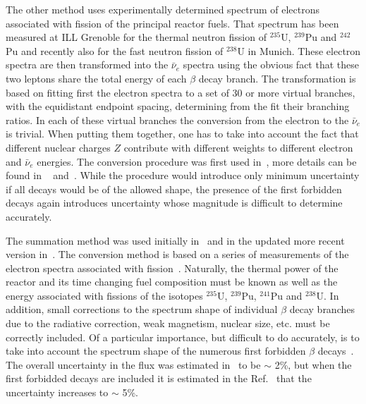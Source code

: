 \documentclass[aps,twocolumn,preprintnumbers,amsmath,superscriptaddress,amssymb,floats,nofootinbib]{revtex4-1}
\begin{document}
 The other method uses experimentally determined spectrum of electrons associated with fission of the principal reactor fuels. That spectrum has been 
 measured at ILL Grenoble for the thermal neutron fission of $^{235}$U, $^{239}$Pu and $^{242}$Pu and recently also for the fast neutron fission of $^{238}$U
 in Munich. These electron spectra are then transformed into the $\bar{\nu}_e$ spectra using the obvious fact that these two leptons share the total energy
 of each $\beta$ decay branch. The transformation is based on fitting first the electron spectra to a set of 30 or more virtual branches, with the equidistant
 endpoint spacing, determining from the fit their branching ratios. In each of these virtual branches the conversion from the electron to the $\bar{\nu}_e$ is 
 trivial. When putting them together, one has to take into account the fact that different nuclear charges $Z$ contribute with different weights to different electron
 and $\bar{\nu}_e$ energies. The conversion procedure was first used in~\cite{vonFeilitzsch,Schreckenbach,Hahn}, more details can be found in
~\cite{Vogel07} and~\cite{Huber}.
 While the procedure would introduce only minimum uncertainty if all decays would be of the allowed shape, the presence
 of the first forbidden decays again introduces uncertainty whose magnitude is difficult to determine accurately.

The summation method was used
initially in~\cite{Davis,Vogel81,Klapdor-Pu,Klapdor-U,Kopeikin} and in the updated more recent version in~\cite{Mueller, Huber}. The conversion method is based on a series
of measurements of the electron spectra associated with fission~\cite{vonFeilitzsch,Schreckenbach,Hahn,Haag}. Naturally, the thermal power of the reactor
and its time changing fuel composition must be known as well as the energy associated with fissions of the isotopes $^{235}$U, $^{239}$Pu, $^{241}$Pu
and $^{238}$U. In addition, small corrections to the spectrum shape of individual $\beta$ decay branches due to the radiative correction, weak magnetism,
nuclear size,
etc. must be correctly included. Of a particular importance, but difficult to do accurately, is to take into account the spectrum shape of the numerous
first forbidden $\beta$ decays~\cite{Hayes}. The overall uncertainty in the flux was estimated in~\cite{Mueller, Huber} to be $\sim$ 2\%, but when the
first forbidded decays are included it is estimated in the Ref.~\cite{Hayes} that the uncertainty increases to $\sim$ 5\%.
\end{document}
